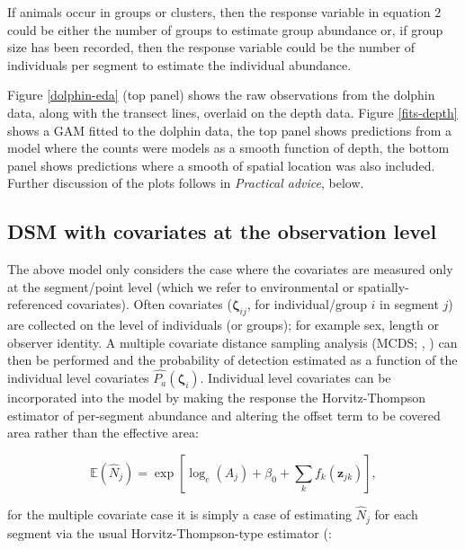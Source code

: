 \documentclass[a4paper,12pt]{article}
\begin{document}
If animals occur in groups or clusters, then the response variable in equation 2 could be either the number of groups to estimate group abundance or, if group size has been recorded, then the response variable could be the number of individuals per segment to estimate the individual abundance.


Figure \ref{dolphin-eda} (top panel) shows the raw observations from the dolphin data, along with the transect lines, overlaid on the depth data. Figure \ref{fits-depth} shows a GAM fitted to the dolphin data, the top panel shows predictions from a model where the counts were models as a smooth function of depth, the bottom panel shows predictions where a smooth of spatial location was also included. Further discussion of the plots follows in \textit{Practical advice}, below.

\subsection*{DSM with covariates at the observation level}

The above model only considers the case where the covariates are measured only at the segment/point level (which we refer to environmental or spatially-referenced covariates). Often covariates ($\bm{\zeta}_{ij}$, for individual/group $i$ in segment $j$) are collected on the level of individuals (or groups); for example sex, length or observer identity. A multiple covariate distance sampling analysis (MCDS; \cite{Marques:2003vb}, \cite{Marques:2007vm}) can then be performed and the probability of detection estimated as a function of the individual level covariates $\hat{P_a}(\bm{\zeta}_i)$. Individual level covariates can be incorporated into the model by making the response the Horvitz-Thompson estimator of per-segment abundance and altering the offset term to be covered area rather than the effective area:

\begin{equation}
\mathbb{E}(\hat{N}_j) = \exp\left[ \log_e \left( A_j \right) + \beta_0 + \sum_k f_k\left(\bm{z}_{jk}\right) \right],
\label{e:gamN}
\end{equation}

for the multiple covariate case it is simply a case of estimating $\hat{N}_j$ for each segment via the usual Horvitz-Thompson-type estimator (\cite{Thompson:2002wi}:
\end{document}
